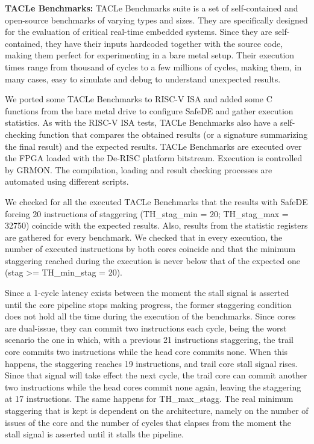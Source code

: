 \textbf{TACLe Benchmarks:} TACLe Benchmarks suite \cite{falk2016taclebench} is a set of self-contained and open-source benchmarks of varying types and sizes. They are specifically designed for the evaluation of critical real-time embedded systems. Since they are self-contained, they have their inputs hardcoded together with the source code, making them perfect for experimenting in a bare metal setup. Their execution times range from thousand of cycles to a few millions of cycles, making them, in many cases, easy to simulate and debug to understand unexpected results.

We ported some TACLe Benchmarks to RISC-V ISA and added some C functions from the bare metal drive to configure SafeDE and gather execution statistics. As with the RISC-V ISA tests, TACLe Benchmarks also have a self-checking function that compares the obtained results (or a signature summarizing the final result) and the expected results. TACLe Benchmarks are executed over the FPGA loaded with the De-RISC platform bitstream. Execution is controlled by GRMON. The compilation, loading and result checking processes are automated using different scripts. 

We checked for all the executed TACLe Benchmarks that the results with SafeDE forcing 20 instructions of staggering (TH\_stag\_min = 20; TH\_stag\_max = 32750) coincide with the expected results. Also, results from the statistic registers are gathered for every benchmark. We checked that in every execution, the number of executed instructions by both cores coincide and that the minimum staggering reached during the execution is never below that of the expected one (stag >= TH\_min\_stag = 20). 

Since a 1-cycle latency exists between the moment the stall signal is asserted until the core pipeline stops making progress, the former staggering condition does not hold all the time during the execution of the benchmarks. Since cores are dual-issue, they can commit two instructions each cycle, being the worst scenario the one in which, with a previous 21 instructions staggering, the trail core commits two instructions while the head core commits none. When this happens, the staggering reaches 19 instructions, and trail core stall signal rises. Since that signal will take effect the next cycle, the trail core can commit another two instructions while the head cores commit none again, leaving the staggering at 17 instructions. The same happens for TH\_max\_stagg. The real minimum staggering that is kept is dependent on the architecture, namely on the number of issues of the core and the number of cycles that elapses from the moment the stall signal is asserted until it stalls the pipeline. 

